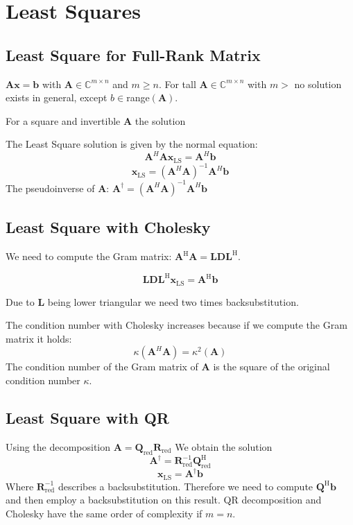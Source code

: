 \documentclass[english]{latex4ei/latex4ei_sheet}
\begin{document}
\section{Least Squares}
\begin{sectionbox}
    \subsection{Least Square for Full-Rank Matrix}
    $\mathbf{A}\mathbf{x} = \mathbf{b}$ with $\mathbf{A}\in\mathbb{C}^{m\times n}$ and $m\geq n$.
    For tall $\mathbf{A}\in\mathbb{C}^{m\times n}$ with $m>$ no solution exists in general, except $b\in$range$(\mathbf{A})$.

    For a square and invertible $\mathbf{A}$ the solution

    The Least Square solution is given by the normal equation:
    $$\mathbf{A}^H\mathbf{A}\mathbf{x}_{\text{LS}} = \mathbf{A}^H\mathbf{b}$$
    $$\mathbf{x}_{\text{LS}} = (\mathbf{A}^H\mathbf{A})^{-1}\mathbf{A}^H\mathbf{b}$$
    The pseudoinverse of $\mathbf{A}$: \quad $\mathbf{A}^\dagger = (\mathbf{A}^H\mathbf{A})^{-1}\mathbf{A}^H\mathbf{b}$

    \subsection{Least Square with Cholesky}
    We need to compute the Gram matrix: $\mathbf{A}^\text{H}\mathbf{A} = \mathbf{L}\mathbf{D}\mathbf{L}^\text{H}$.

    $$\mathbf{L}\mathbf{D}\mathbf{L}^\text{H} \mathbf{x}_{\text{LS}} = \mathbf{A}^\text{H}\mathbf{b}$$

    Due to $\mathbf{L}$ being lower triangular we need two times backsubstitution.

    The condition number with Cholesky increases because if we compute the Gram matrix it holds:
    $$\kappa (\mathbf{A}^H\mathbf{A}) = \kappa^2 (\mathbf{A})$$
    The condition number of the Gram matrix of $\mathbf{A}$ is the square of the original condition number $\kappa$.

\end{sectionbox}
\begin{sectionbox}
    \subsection{Least Square with QR}
    Using the decomposition $\mathbf{A} = \mathbf{Q}_{\text{red}}\mathbf{R}_{\text{red}}$
    We obtain the solution
    $$\mathbf{A}^\dagger = \mathbf{R}^{-1}_{\text{red}}\mathbf{Q}^\text{H}_{\text{red}}$$
    $$\mathbf{x}_{\text{LS}}=\mathbf{A}^\dagger \mathbf{b}$$
    Where $\mathbf{R}^{-1}_{\text{red}}$ describes a backsubstitution.
    Therefore we need to compute $\mathbf{Q}^\text{H}\mathbf{b}$ and then employ a backsubstitution on this result.
    QR decomposition and Cholesky have the same order of complexity if $m=n$.
\end{sectionbox}
\end{document}

